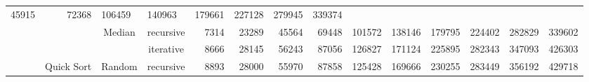 \documentclass{article}
\begin{document}
\begin{table}[h!]
{\begin{tabular}{l|cc|c|rrrrlllllr|}
  \multicolumn{1}{r|}{\cellcolor[HTML]{67FD9A}45915} &
  \multicolumn{1}{r|}{\cellcolor[HTML]{67FD9A}72368} &
  \multicolumn{1}{l|}{\cellcolor[HTML]{67FD9A}106459} &
  \multicolumn{1}{l|}{\cellcolor[HTML]{67FD9A}140963} &
  \multicolumn{1}{l|}{\cellcolor[HTML]{67FD9A}179661} &
  \multicolumn{1}{l|}{\cellcolor[HTML]{67FD9A}227128} &
  \multicolumn{1}{l|}{\cellcolor[HTML]{67FD9A}279945} &
  \cellcolor[HTML]{67FD9A}339374 \\ \cline{4-14} 
 &
  \multicolumn{1}{c|}{\cellcolor[HTML]{67FD9A}} &
  \multirow{-2}{*}{\cellcolor[HTML]{67FD9A}Median} &
  \cellcolor[HTML]{67FD9A}recursive &
  \multicolumn{1}{r|}{\cellcolor[HTML]{67FD9A}7314} &
  \multicolumn{1}{r|}{\cellcolor[HTML]{67FD9A}23289} &
  \multicolumn{1}{r|}{\cellcolor[HTML]{67FD9A}45564} &
  \multicolumn{1}{r|}{\cellcolor[HTML]{67FD9A}69448} &
  \multicolumn{1}{l|}{\cellcolor[HTML]{67FD9A}101572} &
  \multicolumn{1}{l|}{\cellcolor[HTML]{67FD9A}138146} &
  \multicolumn{1}{l|}{\cellcolor[HTML]{67FD9A}179795} &
  \multicolumn{1}{l|}{\cellcolor[HTML]{67FD9A}224402} &
  \multicolumn{1}{l|}{\cellcolor[HTML]{67FD9A}282829} &
  \cellcolor[HTML]{67FD9A}339602 \\ \cline{3-14} 
 &
  \multicolumn{1}{c|}{\cellcolor[HTML]{67FD9A}} &
  \cellcolor[HTML]{67FD9A} &
  \cellcolor[HTML]{67FD9A}iterative &
  \multicolumn{1}{r|}{\cellcolor[HTML]{67FD9A}8666} &
  \multicolumn{1}{r|}{\cellcolor[HTML]{67FD9A}28145} &
  \multicolumn{1}{r|}{\cellcolor[HTML]{67FD9A}56243} &
  \multicolumn{1}{r|}{\cellcolor[HTML]{67FD9A}87056} &
  \multicolumn{1}{l|}{\cellcolor[HTML]{67FD9A}126827} &
  \multicolumn{1}{l|}{\cellcolor[HTML]{67FD9A}171124} &
  \multicolumn{1}{l|}{\cellcolor[HTML]{67FD9A}225895} &
  \multicolumn{1}{l|}{\cellcolor[HTML]{67FD9A}282343} &
  \multicolumn{1}{l|}{\cellcolor[HTML]{67FD9A}347093} &
  \cellcolor[HTML]{67FD9A}426303 \\ \cline{4-14} 
 &
  \multicolumn{1}{c|}{\multirow{-6}{*}{\cellcolor[HTML]{67FD9A}Quick Sort}} &
  \multirow{-2}{*}{\cellcolor[HTML]{67FD9A}Random} &
  \cellcolor[HTML]{67FD9A}recursive &
  \multicolumn{1}{r|}{\cellcolor[HTML]{67FD9A}8893} &
  \multicolumn{1}{r|}{\cellcolor[HTML]{67FD9A}28000} &
  \multicolumn{1}{r|}{\cellcolor[HTML]{67FD9A}55970} &
  \multicolumn{1}{r|}{\cellcolor[HTML]{67FD9A}87858} &
  \multicolumn{1}{l|}{\cellcolor[HTML]{67FD9A}125428} &
  \multicolumn{1}{l|}{\cellcolor[HTML]{67FD9A}169666} &
  \multicolumn{1}{l|}{\cellcolor[HTML]{67FD9A}230255} &
  \multicolumn{1}{l|}{\cellcolor[HTML]{67FD9A}283449} &
  \multicolumn{1}{l|}{\cellcolor[HTML]{67FD9A}356192} &
  \cellcolor[HTML]{67FD9A}429718 \\ \cline{2-14} 

\end{tabular}}
\end{table}
\end{document}
